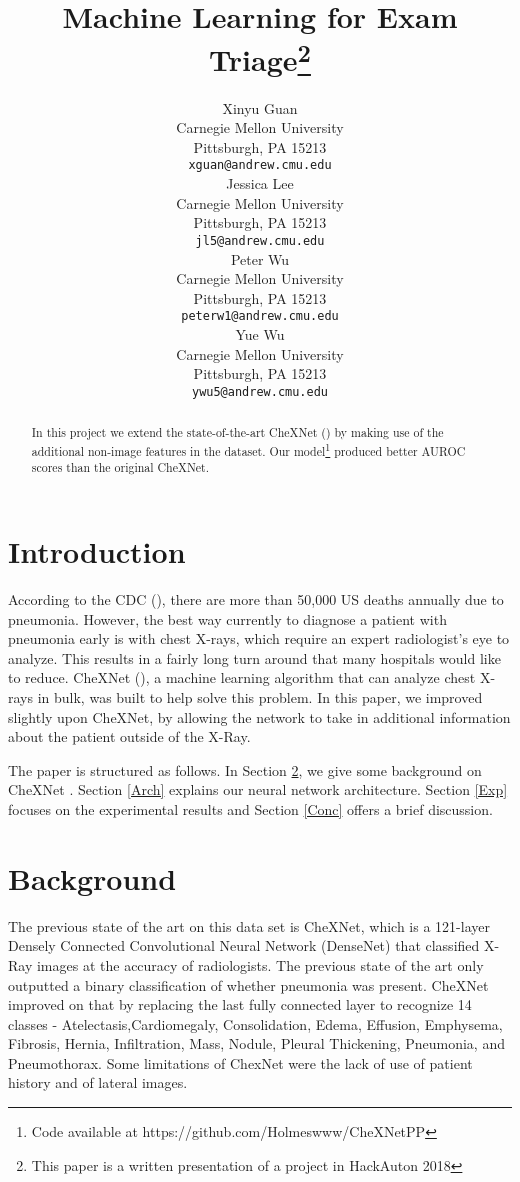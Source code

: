 \documentclass{article}
\title{Machine Learning for Exam Triage\thanks{This paper is a written presentation of a project in HackAuton 2018}}
\author{
    Xinyu Guan \\
    Carnegie Mellon University\\
    Pittsburgh, PA 15213 \\
    \texttt{xguan@andrew.cmu.edu} \\
    \And
    Jessica Lee \\
    Carnegie Mellon University\\
    Pittsburgh, PA 15213 \\
    \texttt{jl5@andrew.cmu.edu} \\
    \AND
    Peter Wu \\
    Carnegie Mellon University\\
    Pittsburgh, PA 15213 \\
    \texttt{peterw1@andrew.cmu.edu} \\
    \And
    Yue Wu \\
    Carnegie Mellon University\\
    Pittsburgh, PA 15213 \\
    \texttt{ywu5@andrew.cmu.edu} \\
}
\begin{document}
\maketitle

\begin{abstract}
  In this project we extend the state-of-the-art CheXNet (\citet{rajpurkar2017chexnet}) by making use of the additional non-image features in the dataset. Our model\footnote{Code available at https://github.com/Holmeswww/CheXNetPP} produced  better AUROC scores than the original CheXNet.
\end{abstract}

\section{Introduction}
According to the CDC (\citet{CDCpneumonia}), there are more than 50,000 US deaths annually due to pneumonia. However, the best way currently to diagnose a patient  with pneumonia early is with chest X-rays, which require an expert radiologist's eye to analyze. This results in a fairly long turn around that many hospitals would like to reduce. CheXNet (\citet{rajpurkar2017chexnet}), a machine learning algorithm that can analyze chest X-rays in bulk, was built to help solve this problem. In this paper, we improved slightly upon CheXNet, by allowing the network to take in additional information about the patient outside of the X-Ray.

The paper is structured as follows. In Section \ref{background}, we give some background on CheXNet \citet{rajpurkar2017chexnet}. Section \ref{Arch} explains our neural network architecture. Section \ref{Exp} focuses on the experimental results and Section \ref{Conc} offers a brief discussion.

\section{Background}
\label{background}

The previous state of the art on this data set is CheXNet, which is a 121-layer Densely Connected Convolutional Neural Network (DenseNet) that classified X-Ray images at the accuracy of radiologists. The previous state of the art only outputted a binary classification of whether pneumonia was present. CheXNet improved on that by replacing the last fully connected layer to recognize 14 classes - Atelectasis,Cardiomegaly, Consolidation, Edema, Effusion, Emphysema, Fibrosis, Hernia, Infiltration, Mass, Nodule, Pleural Thickening, Pneumonia, and Pneumothorax. Some limitations of ChexNet were the lack of use of patient history and of lateral images. 
\end{document}
